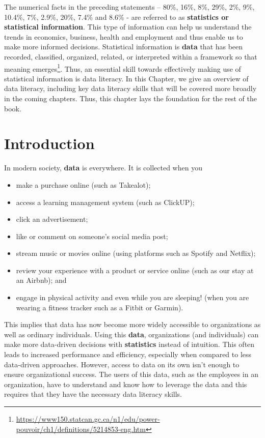 \documentclass[
]{book}
\begin{document}
The numerical facts in the preceding statements -- 80\%, 16\%, 8\%, 29\%, 2\%, 9\%, 10.4\%, 7\%, 2.9\%, 20\%, 7.4\% and 8.6\% - are referred to as \textbf{statistics or statistical information}. This type of information can help us understand the trends in economics, business, health and employment and thus enable us to make more informed decisions. Statistical information is \textbf{data} that has been recorded, classified, organized, related, or interpreted within a framework so that meaning emerges\footnote{\url{https://www150.statcan.gc.ca/n1/edu/power-pouvoir/ch1/definitions/5214853-eng.htm}\href{https://www.media.mit.edu/publications/designing-tools-and-activities-for-data-literacy-learners/}{}}. Thus, an essential skill towards effectively making use of statistical information is data literacy. In this Chapter, we give an overview of data literacy, including key data literacy skills that will be covered more broadly in the coming chapters. Thus, this chapter lays the foundation for the rest of the book.

\section{Introduction}\label{sec1-1}

In modern society, \textbf{data} is everywhere. It is collected when you

\begin{itemize}
\item
  make a purchase online (such as Takealot);
\item
  access a learning management system (such as ClickUP);
\item
  click an advertisement;
\item
  like or comment on someone's social media post;
\item
  stream music or movies online (using platforms such as Spotify and Netflix);
\item
  review your experience with a product or service online (such as our stay at an Airbnb); and
\item
  engage in physical activity and even while you are sleeping! (when you are wearing a fitness tracker such as a Fitbit or Garmin).
\end{itemize}

This implies that data has now become more widely accessible to organizations as well as ordinary individuals. Using this \textbf{data}, organizations (and individuals) can make more data-driven decisions with \textbf{statistics} instead of intuition. This often leads to increased performance and efficiency, especially when compared to less data-driven approaches. However, access to data on its own isn't enough to ensure organizational success. The users of this data, such as the employees in an organization, have to understand and know how to leverage the data and this requires that they have the necessary data literacy skills.
\end{document}
